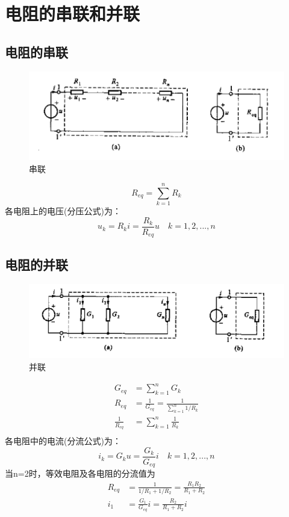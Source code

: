 \documentclass[11pt,a4paper,oneside]{book}
\begin{document}
\section{电阻的串联和并联}
\subsection{电阻的串联}
\begin{figure}[H]
	\centering
	\includegraphics[width=0.5\linewidth]{screenshot130}
	\caption{串联}
	\label{fig:screenshot130}
\end{figure}
\begin{equation}
	R_{eq}=\sum_{k=1}^{n} R_k
\end{equation}
各电阻上的电压(分压公式)为：
\begin{equation}
	u_k=R_ki=\frac{R_k}{R_{eq}}u \quad k=1,2,...,n
\end{equation}
\subsection{电阻的并联}
\begin{figure}[H]
	\centering
	\includegraphics[width=0.5\linewidth]{screenshot131}
	\caption{并联}
	\label{fig:screenshot131}
\end{figure}
\begin{equation}
	\begin{aligned}	
		G_{eq}&=\sum_{k=1}^{n}G_k \\	
		R_{eq}&=\frac{1}{G_{eq}}=\frac{1}{\sum_{k=1}^{n} 1/R_k} \\
		\frac{1}{R_{eq}}&=\sum_{k=1}^{n}\frac{1}{R_k} \\
	\end{aligned}
\end{equation}
各电阻中的电流(分流公式)为：
\begin{equation}
	i_k=G_ku=\frac{G_k}{G_{eq}}i \quad k=1,2,...,n
\end{equation}
当n=2时，等效电阻及各电阻的分流值为
\begin{equation}
	\begin{aligned}
		R_{eq}&=\frac{1}{1/R_1+1/R_2}=\frac{R_1R_2}{R_1+R_2} \\
		i_1&=\frac{G_1}{G_{eq}}i=\frac{R_2}{R_1+R_2}i \\
	\end{aligned}
\end{equation}
\end{document}
